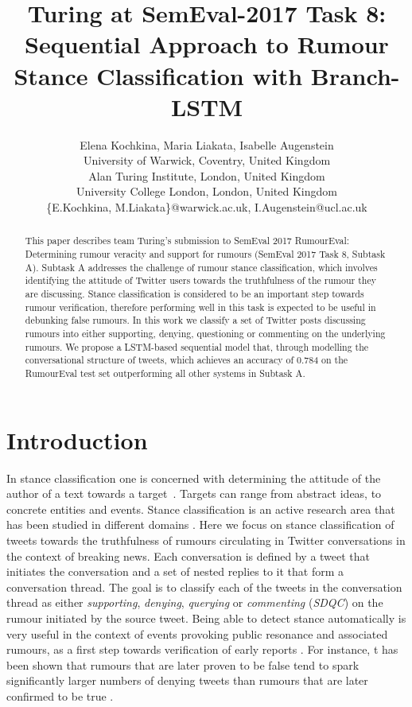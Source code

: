\documentclass[11pt,a4paper]{article}
\title{Turing at SemEval-2017 Task 8: Sequential Approach to Rumour Stance Classification with Branch-LSTM}
\author{
	Elena Kochkina, Maria Liakata, Isabelle Augenstein\\
	 University of Warwick, Coventry, United Kingdom\\
	 Alan Turing Institute, London, United Kingdom\\
	 University College London, London, United Kingdom\\
	\{E.Kochkina, M.Liakata\}@warwick.ac.uk, I.Augenstein@ucl.ac.uk
}
\date{}
\begin{document}
\maketitle

\begin{abstract}
This paper describes team Turing's submission to SemEval 2017 RumourEval: Determining rumour veracity and support for rumours (SemEval 2017 Task 8, Subtask A). Subtask A addresses the challenge of rumour stance classification, which involves identifying the attitude of Twitter users towards the truthfulness of the rumour they are discussing. Stance classification is considered to be an important step towards rumour verification, therefore performing well in this task is expected to be useful in debunking false rumours. In this work we classify a set of Twitter posts discussing rumours into either supporting, denying, questioning or commenting on the underlying rumours. We propose a LSTM-based sequential model that, through modelling the conversational structure of tweets, which achieves an accuracy of 0.784 on the RumourEval test set outperforming all other systems in Subtask A. 
\end{abstract}

\section{Introduction}
In stance classification one is concerned with determining the attitude of the author of a text towards a target~\cite{mohammad2016semeval}. Targets can range from abstract ideas, to concrete entities and events. Stance classification is an active research area that has been studied in different domains \cite{ranade2013stance,chuang2015stance}.
Here we focus on stance classification of tweets towards the truthfulness of rumours circulating in Twitter conversations in the context of breaking news. Each conversation is defined by a tweet that initiates the conversation and a set of nested replies to it that form a conversation thread. The goal is to classify each of the tweets in the conversation thread as either \textit{supporting}, \textit{denying}, \textit{querying} or \textit{commenting} (\textit{SDQC}) on the rumour initiated by the source tweet. Being able to detect stance automatically is very useful in the context of events provoking public resonance and associated rumours, as a first step towards verification of early reports \cite{zhao2015enquiring}. For instance, t has been shown that rumours that are later proven to be false tend to spark significantly larger numbers of denying tweets than rumours that are later confirmed to be true \cite{mendoza2010twitter,procter2013readinga,derczynski2014pheme,zubiaga2016analysing}. 
\end{document}

